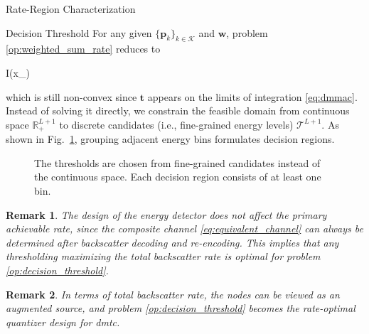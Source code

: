 \documentclass[journal]{IEEEtran}
\newtheorem{remark}{Remark}
\begin{document}
\begin{section}{Rate-Region Characterization}
	\begin{subsection}{Decision Threshold}
		For any given $\{\boldsymbol{p}_k\}_{k \in \mathcal{K}}$ and $\boldsymbol{w}$, problem \eqref{op:weighted_sum_rate} reduces to
		\begin{maxi!}
			{}{I(x_{})}{\label{op:decision_threshold}}{\label{ob:decision_threshold}}
			\addConstraint{\eqref{co:sequential_threshold},\eqref{co:nonnegative_threshold},}
		\end{maxi!}
		which is still non-convex since $\boldsymbol{t}$ appears on the limits of integration \eqref{eq:dmmac}.
		Instead of solving it directly, we constrain the feasible domain from continuous space $\mathbb{R}_+^{L+1}$ to discrete candidates (i.e., fine-grained energy levels) $\mathcal{T}^{L+1}$.
		As shown in Fig.~\ref{fg:discrete_outputs}, grouping adjacent energy bins formulates decision regions.
		\begin{figure}[!t]
			\centering
			\resizebox{0.9\columnwidth}{!}{
				
			}
			\caption{The thresholds are chosen from fine-grained candidates instead of the continuous space. Each decision region consists of at least one bin.}
			\label{fg:discrete_outputs}
		\end{figure}

		\begin{remark}
			The design of the energy detector does not affect the primary achievable rate, since the composite channel \eqref{eq:equivalent_channel} can always be determined after backscatter decoding and re-encoding.
			This implies that any thresholding maximizing the total backscatter rate is optimal for problem \eqref{op:decision_threshold}.
			\label{re:backscatter_decision}
		\end{remark}

		\begin{remark}
			In terms of total backscatter rate, the nodes can be viewed as an augmented source, and problem \eqref{op:decision_threshold} becomes the rate-optimal quantizer design for \gls{dmtc}.
			\label{re:augmented_source}
		\end{remark}


\end{subsection}
\end{section}
\end{document}
